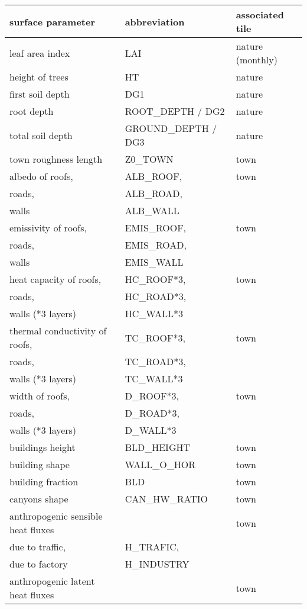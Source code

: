 \begin{table}[h]
\begin{center}
\begin{tabular}{|l|l|l| }
\hline
\textbf{surface parameter} & \textbf{abbreviation} & associated tile\\
\hline
leaf area index & LAI & nature (monthly)\\
\hline
height of trees & HT & nature \\
\hline
first soil depth & DG1 & nature\\
\hline
root depth & ROOT\_DEPTH / DG2 & nature \\
\hline
total soil depth & GROUND\_DEPTH / DG3 & nature \\
\hline
town roughness length & Z0\_TOWN & town \\
\hline
albedo of roofs,  & ALB\_ROOF, & town \\
roads, & ALB\_ROAD, &  \\
walls & ALB\_WALL &\\
\hline
emissivity of roofs,  & EMIS\_ROOF,  & town \\
roads, &  EMIS\_ROAD, & \\
walls & EMIS\_WALL & \\
\hline
heat capacity of roofs, & HC\_ROOF*3, & town \\
roads, &  HC\_ROAD*3, & \\
walls (*3 layers) &  HC\_WALL*3 & \\
\hline
thermal conductivity of roofs, & TC\_ROOF*3,  & town \\
roads, &  TC\_ROAD*3, & \\
walls (*3 layers) & TC\_WALL*3 & \\ 
\hline
width of roofs, & D\_ROOF*3,  & town \\
roads, & D\_ROAD*3, & \\
walls (*3 layers) & D\_WALL*3 & \\
\hline
buildings height & BLD\_HEIGHT & town \\
\hline
building shape & WALL\_O\_HOR & town \\
\hline
building fraction & BLD & town \\
\hline
canyons shape & CAN\_HW\_RATIO & town \\
\hline
anthropogenic sensible heat fluxes &   & town \\
due to traffic, & H\_TRAFIC, & \\
due to factory & H\_INDUSTRY & \\
\hline
anthropogenic latent heat fluxes &  & town \\ 

\end{tabular}
\end{center}
\end{table}
